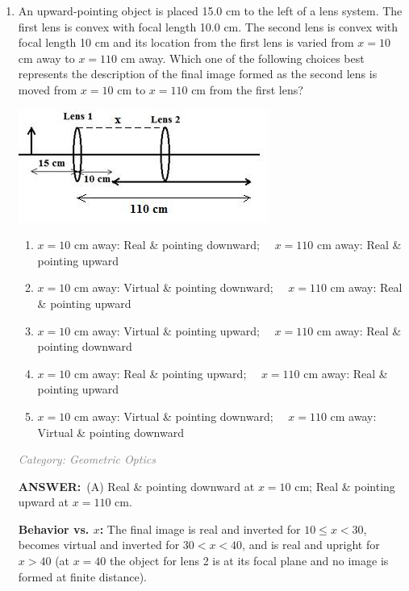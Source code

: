 \documentclass[12pt, a4paper]{article}
\makeatletter
\newcommand{\finalanswer}[1]{\textbf{ANSWER:}~#1}
\newif\if@categoryprinted
\newcommand{\category}[1]{\if@categoryprinted\relax\else\textit{\textcolor{gray}{Category: #1}}\global\@categoryprintedtrue\fi}
\makeatother
\begin{document}
\begin{CJK*}{UTF8}{gbsn}
\begin{enumerate}[itemsep=1.0em, topsep=0.6em]
\item \label{prob:25}
\noindent\begin{minipage}[t]{0.6\linewidth}
\vspace{0pt}
An upward-pointing object is placed 15.0 cm to the left of a lens system. The first lens is convex with focal length 10.0 cm. The second lens is convex with focal length 10 cm and its location from the first lens is varied from $x=10$ cm away to $x=110$ cm away. Which one of the following choices best represents the description of the final image formed as the second lens is moved from $x=10$ cm to $x=110$ cm from the first lens?
\end{minipage}%
\hfill
\begin{minipage}[t]{0.32\linewidth}
\vspace{0pt}
\centering
\includegraphics[width=\linewidth]{Problem_26_Figure.png}
\end{minipage}

\begin{enumerate}[label=(\Alph*)]
    \item $x=10$ cm away: Real \& pointing downward; $\quad x=110$ cm away: Real \& pointing upward
    \item $x=10$ cm away: Virtual \& pointing downward; $\quad x=110$ cm away: Real \& pointing upward
    \item $x=10$ cm away: Virtual \& pointing upward; $\quad x=110$ cm away: Real \& pointing downward
    \item $x=10$ cm away: Real \& pointing upward; $\quad x=110$ cm away: Real \& pointing upward
    \item $x=10$ cm away: Virtual \& pointing downward; $\quad x=110$ cm away: Virtual \& pointing downward
\end{enumerate}

\category{Geometric Optics}
\begin{answerbox}
\finalanswer{(A) Real \& pointing downward at $x=10$ cm; Real \& pointing upward at $x=110$ cm.}
\end{answerbox}
\begin{solutionbox}
\textbf{Behavior vs. $x$:} The final image is real and inverted for $10\le x<30$, becomes virtual and inverted for $30<x<40$, and is real and upright for $x>40$ (at $x=40$ the object for lens 2 is at its focal plane and no image is formed at finite distance).


\end{solutionbox}
\end{enumerate}
\end{CJK*}
\end{document}
